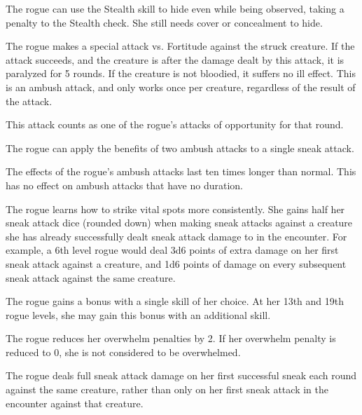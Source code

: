 The rogue can use the Stealth skill to hide even while being observed, taking a  penalty to the Stealth check.
She still needs cover or concealment to hide.

The rogue makes a special attack vs. Fortitude against the struck creature.
If the attack succeeds, and the creature is \bloodied after the damage dealt by this attack, it is paralyzed for 5 rounds.
If the creature is not bloodied, it suffers no ill effect.
This is an ambush attack, and only works once per creature, regardless of the result of the attack.

This attack counts as one of the rogue's attacks of opportunity for that round.

The rogue can apply the benefits of two ambush attacks to a single sneak attack.

The effects of the rogue's ambush attacks last ten times longer than normal.
This has no effect on ambush attacks that have no duration.

The rogue learns how to strike vital spots more consistently.
She gains half her sneak attack dice (rounded down) when making sneak attacks against a creature she has already successfully dealt sneak attack damage to in the encounter.
For example, a 6th level rogue would deal 3d6 points of extra damage on her first sneak attack against a creature, and 1d6 points of damage on every subsequent sneak attack against the same creature.

The rogue gains a  bonus with a single skill of her choice.
At her 13th and 19th rogue levels, she may gain this bonus with an additional skill.

The rogue reduces her overwhelm penalties by 2.
If her overwhelm penalty is reduced to 0, she is not considered to be overwhelmed.

The rogue deals full sneak attack damage on her first successful sneak each round against the same creature, rather than only on her first sneak attack in the encounter against that creature.

